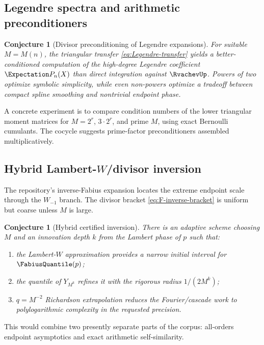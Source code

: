 \documentclass[11pt,oneside]{article}
\newtheorem{conjecture}[theorem]{Conjecture}
\theoremstyle{definition}
\theoremstyle{remark}
\begin{document}
\subsection{Legendre spectra and arithmetic preconditioners}

\begin{conjecture}[Divisor preconditioning of Legendre expansions]
\label{conj:Legendre-preconditioner}
For suitable $M=M(n)$, the triangular transfer \eqref{eq:Legendre-transfer} yields a
better-conditioned computation of the high-degree Legendre coefficient
$\Expectation P_n(X)$ than direct integration against $\RvachevUp$.  Powers of two
optimize symbolic
simplicity, while even non-powers optimize a tradeoff between compact spline smoothing and
nontrivial endpoint phase.
\end{conjecture}

A concrete experiment is to compare condition numbers of the lower triangular moment
matrices for $M=2^r$, $3\cdot2^r$, and prime $M$, using exact Bernoulli cumulants.  The
cocycle suggests prime-factor preconditioners assembled multiplicatively.

\subsection{Hybrid Lambert-$W$/divisor inversion}

The repository's inverse-Fabius expansion locates the extreme endpoint scale through the
$W_{-1}$ branch.  The divisor bracket \eqref{eq:F-inverse-bracket} is uniform but coarse
unless $M$ is large.

\begin{conjecture}[Hybrid certified inversion]
\label{conj:hybrid-inverse}
There is an adaptive scheme choosing $M$ and an innovation depth $k$ from the Lambert
phase of $p$ such that:
\begin{enumerate}
\item the Lambert-$W$ approximation provides a narrow initial interval for
      $\FabiusQuantile(p)$;
\item the quantile of $Y_{M^k}$ refines it with the rigorous radius $1/(2M^k)$;
\item $q=M^{-2}$ Richardson extrapolation reduces the Fourier/cascade work to
polylogarithmic complexity in the requested precision.
\end{enumerate}
\end{conjecture}

This would combine two presently separate parts of the corpus: all-orders endpoint
asymptotics and exact arithmetic self-similarity.
\end{document}
